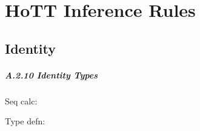 \chapter{HoTT Inference Rules}


\section{Identity}

\paragraph{A.2.10 Identity Types}

\begin{center}
\end{center}

Seq calc:

Type defn:
\begin{prooftree}
\end{prooftree}

\begin{center}
\end{center}

